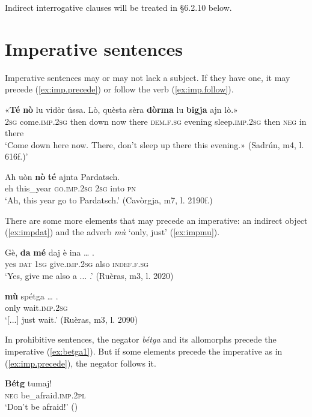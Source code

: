 Indirect interrogative clauses will be treated in §6.2.10 below.


\section{Imperative sentences}
Imperative sentences may or may not lack a subject. If they have one, it may precede (\ref{ex:imp.precede}) or follow the verb (\ref{ex:imp.follow}).

\ea
\label{ex:imp.precede}
\gll «\textbf{Té} \textbf{nò} lu vidòr ússa. Lò, quèsta sèra \textbf{dòrma} lu \textbf{bigja} ajn lò.»\\
\textsc{2sg} come.\textsc{imp.2sg} then down now there  \textsc{dem.f.sg} evening sleep.\textsc{imp.2sg} then \textsc{neg} in there\\
\glt `Come down here now. There, don’t sleep up there this evening.» (Sadrún, m4, l. 616f.)'
\z

\ea
\label{ex:imp.follow}
	\gll  Ah uòn \textbf{nò} \textbf{té} ajnta Pardatsch.\\
eh this\_year \textsc{go.imp.2sg} \textsc{2sg} into \textsc{pn}\\
\glt `Ah, this year go to Pardatsch.' (Cavòrgja, m7, l. 2190f.)
\z

There are some more elements that may precede an imperative: an indirect object (\ref{ex:impdat}) and the adverb \textit{mù} `only, just' (\ref{ex:impmu}).

\ea
\label{ex:impdat}
\gll Gè, \textbf{da} \textbf{mé} daj è ina … . \\
yes \textsc{dat} \textsc{1sg} give.\textsc{imp.2sg} also \textsc{indef.f.sg} \\ 
\glt `Yes, give me also a ... .' (Ruèras, m3, l. 2020)
\z

\ea
\label{ex:impmu}
\gll [...] \textbf{mù} spétga … .\\
{} only wait.\textsc{imp.2sg}\\
\glt `[...] just wait.' (Ruèras, m3, l. 2090)
\z


In prohibitive sentences, the negator \textit{bétga} and its allomorphs precede the imperative (\ref{ex:betga1}). But if some elements precede the imperative as in (\ref{ex:imp.precede}), the negator follows it.

\ea
\label{ex:betga1}
\gll  \textbf{Bétg} tumaj!\\
\textsc{neg} be\_afraid.\textsc{imp.2pl}\\
\glt `Don’t be afraid!' ()
\z

